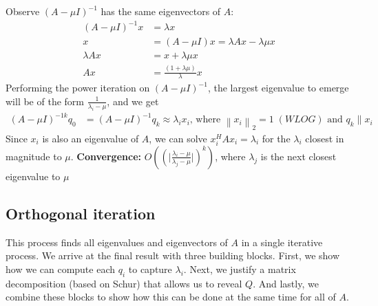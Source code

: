 \documentclass{article}
\newcommand{\norm}[2]{\left\lVert#1\right\rVert_#2}
\newcommand{\abs}[1]{\lvert#1\rvert}
\begin{document}
Observe $(A - \mu I)^{-1}$ has the same eigenvectors of $A$:
\begin{align*}
    (A - \mu I)^{-1}x &= \lambda x\\
    x &= (A - \mu I)x = \lambda Ax - \lambda \mu x\\
    \lambda Ax &= x + \lambda \mu x\\
    Ax &= \frac{(1 + \lambda \mu)}{\lambda}x
\end{align*}
Performing the power iteration on $(A - \mu I)^{-1}$, the largest eigenvalue to emerge will be of the form $\frac{1}{\lambda_i - \mu}$, and we get
\begin{align*}
    (A - \mu I)^{-1k}q_0 &= (A - \mu I)^{-1}q_{k} \approx \lambda_i x_i \textrm{, where } \norm{x_i}{2} = 1 \; (WLOG) \textrm{ and } q_k \parallel x_i
\end{align*}
Since $x_i$ is also an eigenvalue of $A$, we can solve $x_i^HAx_i = \lambda_i$ for the $\lambda_i$ closest in magnitude to $\mu$.
\textbf{Convergence: } $O((\abs{\frac{\lambda_i - \mu}{\lambda_j - \mu}})^k)$, where $\lambda_j$ is the next closest eigenvalue to $\mu$

\subsection{Orthogonal iteration}
This process finds all eigenvalues and eigenvectors of $A$ in a single iterative process. We arrive at the final result with three building blocks. First, we show how we can compute each $q_i$ to capture $\lambda_i$. Next, we justify a matrix decomposition (based on Schur) that allows us to reveal $Q$. And lastly, we combine these blocks to show how this can be done at the same time for all of $A$.
\end{document}
